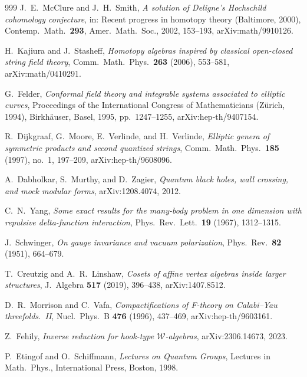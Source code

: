 \documentclass[11pt]{memoir}
\begin{document}
\begin{thebibliography}{999}
J.~E.~McClure and J.~H.~Smith, \emph{A solution of Deligne's Hochschild cohomology conjecture}, in: Recent progress in homotopy theory (Baltimore, 2000), Contemp.\ Math.\ \textbf{293}, Amer.\ Math.\ Soc., 2002, 153--193, arXiv:math/9910126.

H.~Kajiura and J.~Stasheff, \emph{Homotopy algebras inspired by classical open-closed string field theory}, Comm.\ Math.\ Phys.\ \textbf{263} (2006), 553--581, arXiv:math/0410291.

G.~Felder, \emph{Conformal field theory and integrable systems associated to elliptic curves}, Proceedings of the International Congress of Mathematicians (Z\"urich, 1994), Birkh\"auser, Basel, 1995, pp.~1247--1255, arXiv:hep-th/9407154.

R.~Dijkgraaf, G.~Moore, E.~Verlinde, and H.~Verlinde, \emph{Elliptic genera of symmetric products and second quantized strings}, Comm.\ Math.\ Phys.\ \textbf{185} (1997), no.~1, 197--209, arXiv:hep-th/9608096.

A.~Dabholkar, S.~Murthy, and D.~Zagier, \emph{Quantum black holes, wall crossing, and mock modular forms}, arXiv:1208.4074, 2012.

C.~N.~Yang, \emph{Some exact results for the many-body problem in one dimension with repulsive delta-function interaction}, Phys.\ Rev.\ Lett.\ \textbf{19} (1967), 1312--1315.

J.~Schwinger, \emph{On gauge invariance and vacuum polarization}, Phys.\ Rev.\ \textbf{82} (1951), 664--679.

T.~Creutzig and A.~R.~Linshaw, \emph{Cosets of affine vertex algebras inside larger structures}, J.~Algebra \textbf{517} (2019), 396--438, arXiv:1407.8512.

D.~R.~Morrison and C.~Vafa, \emph{Compactifications of F-theory on Calabi--Yau threefolds.~II}, Nucl.\ Phys.\ B \textbf{476} (1996), 437--469, arXiv:hep-th/9603161.

Z.~Fehily, \emph{Inverse reduction for hook-type $\mathcal{W}$-algebras}, arXiv:2306.14673, 2023.

P.~Etingof and O.~Schiffmann, \emph{Lectures on Quantum Groups}, Lectures in Math.\ Phys., International Press, Boston, 1998.


\end{thebibliography}
\end{document}

